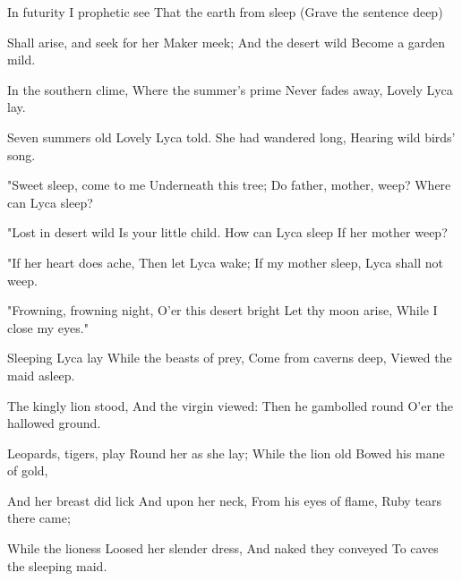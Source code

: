 \begin{poem}

\begin{stanza}
In futurity\verseline
I prophetic see\verseline
That the earth from sleep\verseline
(Grave the sentence deep)
\end{stanza}
\begin{stanza}
\verseindent Shall arise, and seek\verseline
for her Maker meek;\verseline
And the desert wild\verseline
Become a garden mild.
\end{stanza}
\begin{stanza}
\verseindent In the southern clime,\verseline
Where the summer's prime\verseline
Never fades away,\verseline
Lovely Lyca lay.
\end{stanza}
\begin{stanza}
\verseindent Seven summers old\verseline
Lovely Lyca told.\verseline
She had wandered long,\verseline
Hearing wild birds' song.
\end{stanza}
\begin{stanza}
\verseindent "Sweet sleep, come to me\verseline
Underneath this tree;\verseline
Do father, mother, weep?\verseline
Where can Lyca sleep?
\end{stanza}
\begin{stanza}
\verseindent "Lost in desert wild\verseline
Is your little child.\verseline
How can Lyca sleep\verseline
If her mother weep?
\end{stanza}
\begin{stanza}
\verseindent "If her heart does ache,\verseline
Then let Lyca wake;\verseline
If my mother sleep,\verseline
Lyca shall not weep.
\end{stanza}
\begin{stanza}
\verseindent "Frowning, frowning night,\verseline
O'er this desert bright\verseline
Let thy moon arise,\verseline
While I close my eyes."
\end{stanza}
\begin{stanza}
\verseindent Sleeping Lyca lay\verseline
While the beasts of prey,\verseline
Come from caverns deep,\verseline
Viewed the maid asleep.
\end{stanza}
\begin{stanza}
\verseindent The kingly lion stood,\verseline
And the virgin viewed:\verseline
Then he gambolled round\verseline
O'er the hallowed ground.
\end{stanza}
\begin{stanza}
\verseindent Leopards, tigers, play\verseline
Round her as she lay;\verseline
While the lion old\verseline
Bowed his mane of gold,
\end{stanza}
\begin{stanza}
\verseindent And her breast did lick\verseline
And upon her neck,\verseline
From his eyes of flame,\verseline
Ruby tears there came;
\end{stanza}
\begin{stanza}
\verseindent While the lioness\verseline
Loosed her slender dress,\verseline
And naked they conveyed\verseline
To caves the sleeping maid.
\end{stanza}

\end{poem}

